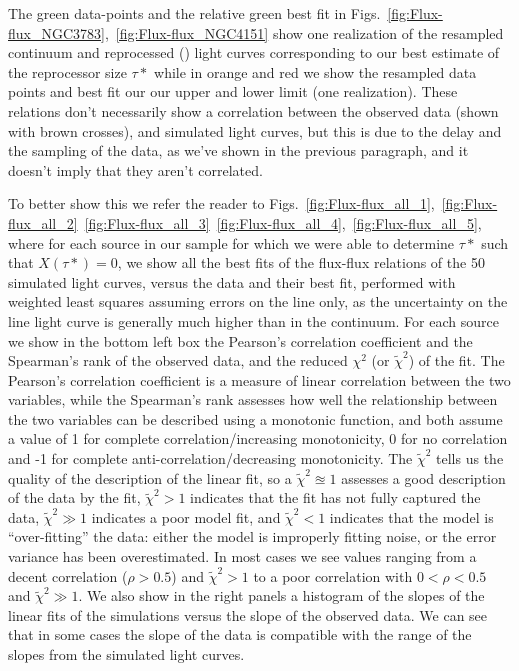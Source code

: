 The green data-points and the relative green best fit in Figs.~\ref{fig:Flux-flux_NGC3783},~\ref{fig:Flux-flux_NGC4151} show one realization of the resampled continuum and reprocessed (\kalfa{}) light curves corresponding to our best estimate of the reprocessor size $\tau*$ while in orange and red we show the resampled data points and best fit our our upper and lower limit (one realization). These relations don't necessarily show a correlation between the observed data (shown with brown crosses), and simulated light curves, but this is due to the delay and the sampling of the data, as we've shown in the previous paragraph, and it doesn't imply that they aren't correlated.

To better show this we refer the reader to Figs.~\ref{fig:Flux-flux_all_1},~\ref{fig:Flux-flux_all_2}~\ref{fig:Flux-flux_all_3}~\ref{fig:Flux-flux_all_4},~\ref{fig:Flux-flux_all_5}, where for each source in our sample for which we were able to determine $\tau*$ such that $X(\tau*)=0$, we show all the best fits of the flux-flux relations of the 50 simulated light curves, versus the data and their best fit, performed with weighted least squares assuming errors on the \kalfa{} line only, as the uncertainty on the \kalfa{} line light curve is generally much higher than in the continuum. For each source we show in the bottom left box the Pearson's correlation coefficient and the Spearman's rank of the observed data, and the reduced $\chi^2$ (or $\tilde\chi^2$) of the fit. The Pearson's correlation coefficient is a measure of linear correlation between the two variables, while the Spearman's rank assesses how well the relationship between the two variables can be described using a monotonic function, and both assume a value of 1 for complete correlation/increasing monotonicity, 0 for no correlation and -1 for complete anti-correlation/decreasing monotonicity. The $\tilde\chi^2$ tells us the quality of the description of the linear fit, so a $\tilde\chi^2\approxeq1$ assesses a good description of the data by the fit, $\tilde\chi^2>1$ indicates that the fit has not fully captured the data, $\tilde\chi^2\gg 1$ indicates a poor model fit, and $\tilde\chi^2<1$ indicates that the model is ``over-fitting'' the data: either the model is improperly fitting noise, or the error variance has been overestimated. In most cases we see values ranging from a decent correlation ($\rho >0.5$) and $\tilde\chi^2>1$ to a poor correlation with $0<\rho <0.5$ and $\tilde\chi^2\gg 1$. We also show in the right panels a histogram of the slopes of the linear fits of the simulations versus the slope of the observed data. We can see that in some cases the slope of the data is compatible with the range of the slopes from the simulated light curves.

